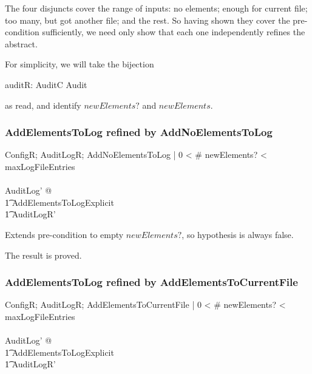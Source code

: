 The four disjuncts cover the range of inputs:
no elements;
enough for current file;
too many, but got another file;
and
the rest.
So having shown they cover the pre-condition sufficiently,
we need only show that each one independently refines the abstract.

For simplicity,
we will take the bijection 
\begin{zed}
	auditR: AuditC \bij Audit
\end{zed}
as read,
and identify $newElements?$ and $newElements$.

\subsubsection{AddElementsToLog refined by AddNoElementsToLog}
\label{refine:NoElements}
\begin{zed}
ConfigR; AuditLogR; AddNoElementsToLog |
0 < \# newElements? < maxLogFileEntries
\\ \shows
\\ \exists AuditLog' 
@ 
\\ \t1	AddElementsToLogExplicit
\\ \t1	\land AuditLogR'
\end{zed}

Extends pre-condition to empty $newElements?$, so hypothesis is always false.

The result is proved.

\subsubsection{AddElementsToLog refined by AddElementsToCurrentFile}
\label{refine:Current}
\begin{zed}
ConfigR; AuditLogR; AddElementsToCurrentFile |
0 < \# newElements? < maxLogFileEntries
\\ \shows
\\ \exists AuditLog' 
@ 
\\ \t1	AddElementsToLogExplicit
\\ \t1	\land AuditLogR'
\end{zed}

